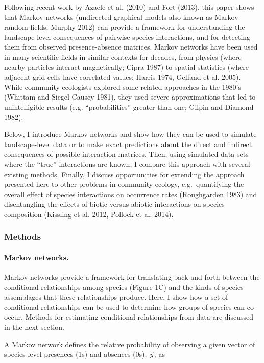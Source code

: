 \documentclass[12pt,]{article}
\begin{document}
\begin{spacing}{1.9}
\begin{flushleft}
Following recent work by Azaele et al. (2010) and Fort (2013), this
paper shows that Markov networks (undirected graphical models also known
as Markov random fields; Murphy 2012) can provide a framework for
understanding the landscape-level consequences of pairwise species
interactions, and for detecting them from observed presence-absence
matrices. Markov networks have been used in many scientific fields in
similar contexts for decades, from physics (where nearby particles
interact magnetically; Cipra 1987) to spatial statistics (where adjacent
grid cells have correlated values; Harris 1974, Gelfand et al. 2005).
While community ecologists explored some related approaches in the
1980's (Whittam and Siegel-Causey 1981), they used severe approximations
that led to unintelligible results (e.g. ``probabilities'' greater than
one; Gilpin and Diamond 1982).

Below, I introduce Markov networks and show how they can be used to
simulate landscape-level data or to make exact predictions about the
direct and indirect consequences of possible interaction matrices. Then,
using simulated data sets where the ``true'' interactions are known, I
compare this approach with several existing methods. Finally, I discuss
opportunities for extending the approach presented here to other
problems in community ecology, e.g.~quantifying the overall effect of
species interactions on occurrence rates (Roughgarden 1983) and
disentangling the effects of biotic versus abiotic interactions on
species composition (Kissling et al. 2012, Pollock et al. 2014).

\subsubsection{Methods}\label{methods}

\paragraph{Markov networks.}\label{markov-networks.}

Markov networks provide a framework for translating back and forth
between the conditional relationships among species (Figure 1C) and the
kinds of species assemblages that these relationships produce. Here, I
show how a set of conditional relationships can be used to determine how
groups of species can co-occur. Methods for estimating conditional
relationships from data are discussed in the next section.

A Markov network defines the relative probability of observing a given
vector of species-level presences (1s) and absences (0s), \(\vec{y}\),
as


\end{flushleft}
\end{spacing}
\end{document}
